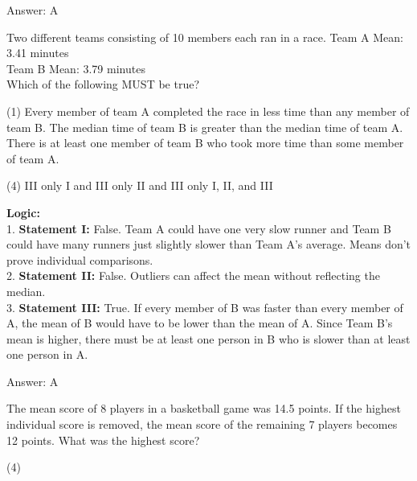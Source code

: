 \documentclass[11pt,paper=a4,answers]{exam}
\begin{document}
\begin{questions}
\begin{solution}
\vspace{30pt}

Answer: \colorbox{yellow!100}{A}
\end{solution}

\vspace{60pt}

\question
Two different teams consisting of 10 members each ran in a race.
Team A Mean: 3.41 minutes \\
Team B Mean: 3.79 minutes \\
Which of the following MUST be true?
\begin{tasks}(1)
    \task Every member of team A completed the race in less time than any member of team B.
    \task The median time of team B is greater than the median time of team A.
    \task There is at least one member of team B who took more time than some member of team A.
\end{tasks}
\begin{tasks}(4)
    \task III only
    \task I and III only
    \task II and III only
    \task I, II, and III
\end{tasks}

\begin{solution}
\textbf{Logic:} \\
1. \textbf{Statement I:} False. Team A could have one very slow runner and Team B could have many runners just slightly slower than Team A's average. Means don't prove individual comparisons. \\
2. \textbf{Statement II:} False. Outliers can affect the mean without reflecting the median. \\
3. \textbf{Statement III:} True. If every member of B was faster than every member of A, the mean of B would have to be lower than the mean of A. Since Team B's mean is higher, there must be at least one person in B who is slower than at least one person in A.

\vspace{30pt}

Answer: \colorbox{yellow!100}{A}
\end{solution}

\vspace{60pt}

\question
The mean score of 8 players in a basketball game was 14.5 points. If the highest individual score is removed, the mean score of the remaining 7 players becomes 12 points. What was the highest score?
\begin{tasks}(4)
\end{tasks}


\end{questions}
\end{document}
